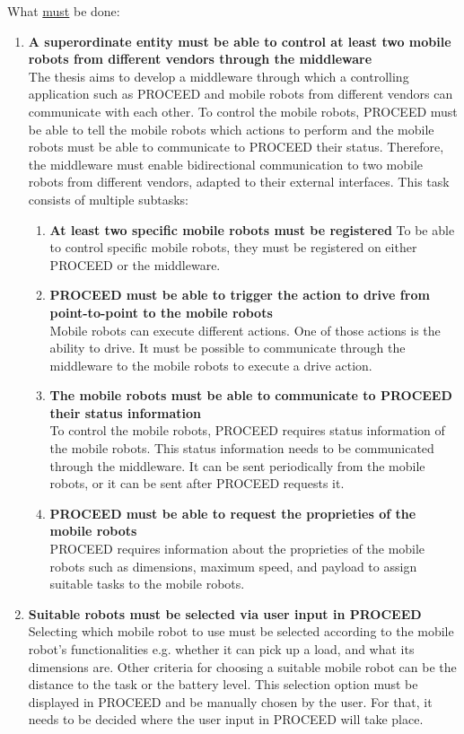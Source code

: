 What \underline{must} be done:
\begin{enumerate}
   \item \textbf{A superordinate entity must be able to control at least two mobile robots from different vendors through the middleware} \hfill \\
	The thesis aims to develop a middleware through which a controlling application such as PROCEED and mobile robots from different vendors can communicate with each other. To control the mobile robots, PROCEED must be able to tell the mobile robots which actions to perform and the mobile robots must be able to communicate to PROCEED their status. Therefore, the middleware must enable bidirectional communication to two mobile robots from different vendors, adapted to their external interfaces. This task consists of multiple subtasks:
   \begin{enumerate}
     \item\textbf{At least two specific mobile robots must be registered}
To be able to control specific mobile robots, they must be registered on either PROCEED or the middleware.
     \item\textbf{PROCEED must be able to trigger the action to drive from point-to-point to the mobile robots} \hfill \\
Mobile robots can execute different actions. One of those actions is the ability to drive. It must be possible to communicate through the middleware to the mobile robots to execute a drive action.
     \item\textbf{The mobile robots must be able to communicate to PROCEED their status information} \hfill \\
To control the mobile robots, PROCEED requires status information of the mobile robots. This status information needs to be communicated through the middleware. It can be sent periodically from the mobile robots, or it can be sent after PROCEED requests it.
     \item\textbf{PROCEED must be able to request the proprieties of the mobile robots} \hfill \\
PROCEED requires information about the proprieties of the mobile robots such as dimensions, maximum speed, and payload to assign suitable tasks to the mobile robots.
   \end{enumerate}
     \item\textbf{Suitable robots must be selected via user input in PROCEED} \hfill \\
Selecting which mobile robot to use must be selected according to the mobile robot’s functionalities e.g. whether it can pick up a load, and what its dimensions are. Other criteria for choosing a suitable mobile robot can be the distance to the task or the battery level. This selection option must be displayed in PROCEED and be manually chosen by the user. For that, it needs to be decided where the user input in PROCEED will take place.

\end{enumerate}
